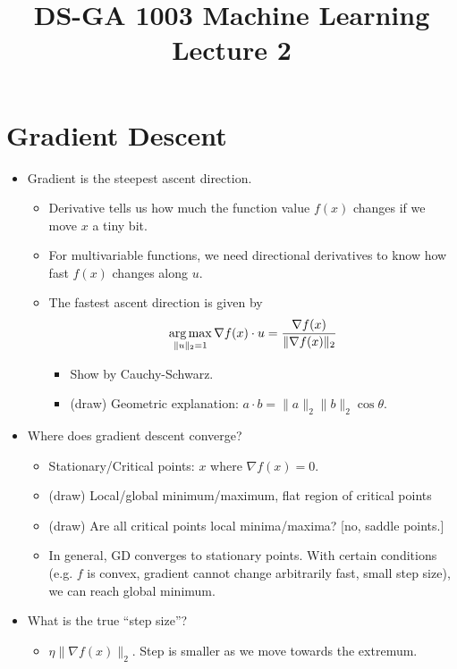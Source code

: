 \documentclass[11pt]{article}
\begin{document}
\title{DS-GA 1003 Machine Learning \\ Lecture 2}
\maketitle

\section{Gradient Descent}
\begin{itemize}
    \item Gradient is the steepest ascent direction.
        \begin{itemize}
            \item Derivative tells us how much the function value $f(x)$ changes if we move $x$ a tiny bit.
            \item For multivariable functions, we need directional derivatives to know how fast $f(x)$ changes along $u$.
            \item The fastest ascent direction is given by
                $$
                \operatorname*{arg\,max}_{\|u\|_2=1} \nabla f(x) \cdot u = \frac{\nabla f(x)}{\|\nabla f(x)\|_2}
                $$
                \begin{itemize}
                    \item Show by Cauchy-Schwarz.
                    \item (draw) Geometric explanation: $a\cdot b = \|a\|_2\|b\|_2\cos\theta$.
                \end{itemize}
        \end{itemize}

    \item Where does gradient descent converge?
        \begin{itemize}
            \item Stationary/Critical points: $x$ where $\nabla f(x) = 0$.
            \item (draw) Local/global minimum/maximum, flat region of critical points
            \item (draw) Are all critical points local minima/maxima? [no, saddle points.]
            \item In general, GD converges to stationary points. With certain conditions (e.g. $f$ is convex, gradient cannot change arbitrarily fast, small step size), we can reach global minimum.
        \end{itemize}

    \item What is the true ``step size''?
        \begin{itemize}
            \item $\eta\|\nabla f(x)\|_2$. Step is smaller as we move towards the extremum. 
        \end{itemize}


\end{itemize}
\end{document}
